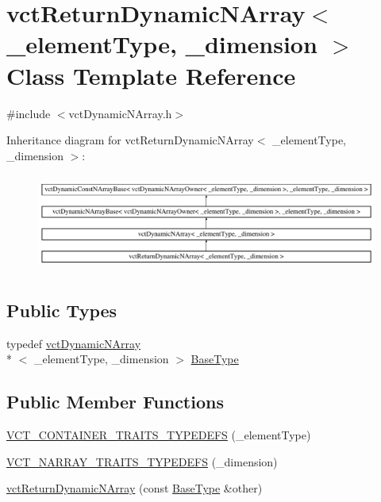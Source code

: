 \hypertarget{classvct_return_dynamic_n_array}{\section{vct\-Return\-Dynamic\-N\-Array$<$ \-\_\-element\-Type, \-\_\-dimension $>$ Class Template Reference}
\label{classvct_return_dynamic_n_array}
}


{\ttfamily \#include $<$vct\-Dynamic\-N\-Array.\-h$>$}

Inheritance diagram for vct\-Return\-Dynamic\-N\-Array$<$ \-\_\-element\-Type, \-\_\-dimension $>$\-:\begin{figure}[H]
\begin{center}
\leavevmode
\includegraphics[height=3.241679cm]{df/d40/classvct_return_dynamic_n_array}
\end{center}
\end{figure}
\subsection*{Public Types}
\begin{DoxyCompactItemize}
\item 
typedef \hyperlink{classvct_dynamic_n_array}{vct\-Dynamic\-N\-Array}\\*
$<$ \-\_\-element\-Type, \-\_\-dimension $>$ \hyperlink{classvct_return_dynamic_n_array_a35849019078c617ed43b530c49f0cfe8}{Base\-Type}
\end{DoxyCompactItemize}
\subsection*{Public Member Functions}
\begin{DoxyCompactItemize}
\item 
\hyperlink{classvct_return_dynamic_n_array_af1ced98bb6f1bb687abc5a7ea545c9cf}{V\-C\-T\-\_\-\-C\-O\-N\-T\-A\-I\-N\-E\-R\-\_\-\-T\-R\-A\-I\-T\-S\-\_\-\-T\-Y\-P\-E\-D\-E\-F\-S} (\-\_\-element\-Type)
\item 
\hyperlink{classvct_return_dynamic_n_array_ab60fd293ad964352f465fdd1d23732be}{V\-C\-T\-\_\-\-N\-A\-R\-R\-A\-Y\-\_\-\-T\-R\-A\-I\-T\-S\-\_\-\-T\-Y\-P\-E\-D\-E\-F\-S} (\-\_\-dimension)
\item 
\hyperlink{classvct_return_dynamic_n_array_ac52b44fb01166eca1a6b97fe949777fd}{vct\-Return\-Dynamic\-N\-Array} (const \hyperlink{classvct_dynamic_n_array_adc62cbbc97a16fa388dd96d4404fd075}{Base\-Type} \&other)
\end{DoxyCompactItemize}
